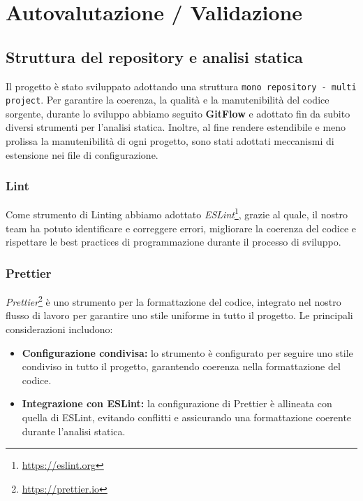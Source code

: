 \section{Autovalutazione / Validazione}




%
%
%
\subsection{Struttura del repository e analisi statica}

Il progetto è stato sviluppato adottando una struttura \texttt{mono repository - multi project}.
%
Per garantire la coerenza, la qualità e la manutenibilità del codice sorgente, durante lo sviluppo abbiamo seguito \textbf{GitFlow} e adottato fin da subito diversi strumenti per l'analisi statica. 
%
Inoltre, al fine rendere estendibile e meno prolissa la manutenibilità di ogni progetto, sono stati adottati meccanismi di estensione nei file di configurazione.

%
%
%
\subsubsection{Lint}

Come strumento di Linting abbiamo adottato \emph{ESLint}\footnote{\url{https://eslint.org}}, grazie al quale, il nostro team ha potuto identificare e correggere errori, migliorare la coerenza del codice e rispettare le best practices di programmazione durante il processo di sviluppo.

%
%
%
\subsubsection{Prettier}

\emph{Prettier}\footnote{\url{https://prettier.io}} è uno strumento per la formattazione del codice, integrato nel nostro flusso di lavoro per garantire uno stile uniforme in tutto il progetto.
%
Le principali considerazioni includono:

\begin{itemize}
  \item \textbf{Configurazione condivisa:} lo strumento è configurato per seguire uno stile condiviso in tutto il progetto, garantendo coerenza nella formattazione del codice.

  \item \textbf{Integrazione con ESLint:} la configurazione di Prettier è allineata con quella di ESLint, evitando conflitti e assicurando una formattazione coerente durante l'analisi statica.
\end{itemize}

